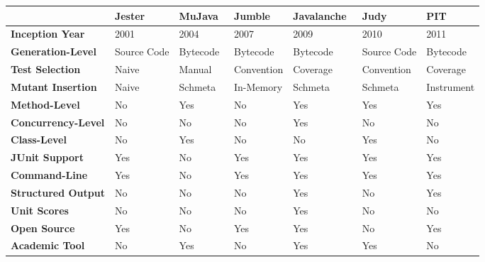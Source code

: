 \begin{landscape}
  \begin{table}[h]
    \centering
    \begin{threeparttable}
      \begin{tabular}{|l|l|l|l|l|l|l|}
        \rowcolor[RGB]{169,196,223}
        \hline & \textbf{Jester~\cite{Jester}} & \textbf{MuJava~\cite{MOK05}} & \textbf{Jumble~\cite{Jumble}} & \textbf{Javalanche~\cite{SZ09}} & \textbf{Judy~\cite{MR10}} & \textbf{PIT~\cite{PIT}} \\
        \hline \cellcolor[RGB]{169,196,223} \textbf{Inception Year} & 2001 & 2004 & 2007 & 2009 & 2010 & 2011 \\
        \hline \cellcolor[RGB]{169,196,223} \textbf{Generation-Level} & Source Code & Bytecode & Bytecode & Bytecode & Source Code & Bytecode \\
        \hline \cellcolor[RGB]{169,196,223} \textbf{Test Selection} & Naive\tnote{f} & Manual & Convention & Coverage & Convention & Coverage \\
        \hline \cellcolor[RGB]{169,196,223} \textbf{Mutant Insertion} & Naive\tnote{f} & Schmeta & In-Memory & Schmeta & Schmeta\tnote{c} & Instrument \\
        \hline \cellcolor[RGB]{169,196,223} \textbf{Method-Level} & No & Yes & No & Yes & Yes & Yes \\
        \hline \cellcolor[RGB]{169,196,223} \textbf{Concurrency-Level} & No & No & No & Yes & No & No \\
        \hline \cellcolor[RGB]{169,196,223} \textbf{Class-Level} & No & Yes & No & No & Yes\tnote{b} & No \\
        \hline \cellcolor[RGB]{169,196,223} \textbf{JUnit Support} & Yes & No\tnote{c} & Yes & Yes & Yes & Yes \\
        \hline \cellcolor[RGB]{169,196,223} \textbf{Command-Line} & Yes & No & Yes & Yes & Yes & Yes \\
        \hline \cellcolor[RGB]{169,196,223} \textbf{Structured Output} & No & No & No & Yes & No & Yes \\
        \hline \cellcolor[RGB]{169,196,223} \textbf{Unit Scores} & No & No & No & Yes & No & No\tnote{g} \\
        \hline \cellcolor[RGB]{169,196,223} \textbf{Open Source} & Yes & No\tnote{d} & Yes & Yes & No & Yes \\
        \hline \cellcolor[RGB]{169,196,223} \textbf{Academic Tool} & No & Yes & No & Yes & Yes & No \\

\end{tabular}
\end{threeparttable}
\end{table}
\end{landscape}
